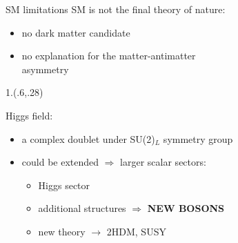 \documentclass[10pt,UKenglish, leqno, xcolor = dvipsnames]{beamer}
\begin{document}
	\begin{frame}{SM limitations}
		\vfill
		SM is not the final theory of nature:
		\begin{itemize}
			\item no dark matter candidate  
			\item no explanation for the matter-antimatter\\ asymmetry 
		\end{itemize}
		\begin{textblock}{1.}(.6,.28)
		\end{textblock}
		\vspace{1cm}
		Higgs field:
		\begin{itemize}
			\item a complex doublet under SU(2)$_L$ symmetry group
			\item could be extended $\Rightarrow$ larger scalar sectors:
			\begin{itemize}
				\item Higgs sector
				\item additional structures $\Rightarrow$ \textbf{NEW BOSONS}
				\item new theory $\rightarrow$ 2HDM, SUSY
			\end{itemize} 
		\end{itemize}
		\vfill
	\end{frame}
		
\end{document}

